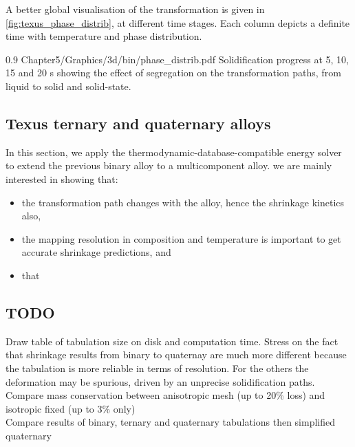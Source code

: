 A better global visualisation of the transformation is given in \cref{fig:texus_phase_distrib}, at different time stages.
Each column depicts a definite time with temperature and phase distribution. 


\begin{figureth}
{0.9}
{Chapter5/Graphics/3d/bin/phase_distrib.pdf}
{Solidification progress at 5, 10, 15 and 20 s showing the effect of segregation on the transformation paths, from liquid to solid and solid-state.}
\label{fig:texus_phase_distrib}
\end{figureth}



\subsection{Texus ternary and quaternary alloys}
In this section, we apply the thermodynamic-database-compatible energy solver to extend the previous binary alloy to a multicomponent alloy.
we are mainly interested in showing that:
\begin{itemize}
\itemsep0em
\item  the transformation path changes with the alloy, hence the shrinkage kinetics also,
\item  the mapping resolution in composition and temperature is important to get accurate shrinkage predictions, and
\item  that 
\end{itemize}  

 
\subsection{TODO}

Draw table of tabulation size on disk and computation time. Stress on the fact that shrinkage results from binary to quaternay are much more different because
the tabulation is more reliable in terms of resolution. For the others the deformation may be spurious, driven by an unprecise solidification paths. \\
Compare mass conservation between anisotropic mesh (up to 20\% loss) and isotropic fixed (up to 3\% only) \\
Compare results of binary, ternary and quaternary tabulations then simplified quaternary \\
 
